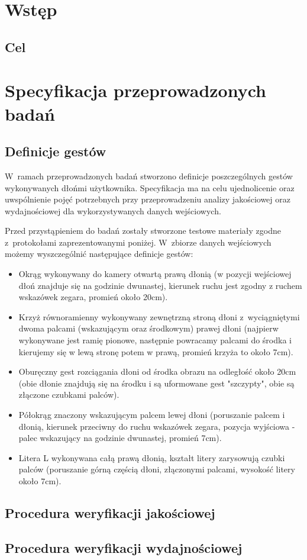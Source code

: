\chapter{Wstęp}\label{Chapter_Wstep}

\section{Cel}\label{Section_Cel}

\chapter{Specyfikacja przeprowadzonych badań}\label{Chapter_SpecyfikacjaPrzeprowadzonychBadan}

\section{Definicje gestów}\label{Section_DefinicjeGestow}

W~ramach przeprowadzonych badań stworzono definicje poszczególnych gestów wykonywanych dłońmi użytkownika. Specyfikacja ma na celu ujednolicenie oraz uwspólnienie pojęć potrzebnych przy przeprowadzeniu analizy jakościowej oraz wydajnościowej dla wykorzystywanych danych wejściowych.

Przed przystąpieniem do badań zostały stworzone testowe materiały zgodne z~protokołami zaprezentowanymi poniżej. W~zbiorze danych wejściowych możemy wyszczególnić następujące definicje gestów:

\begin{itemize}
  \item Okrąg wykonywany do kamery otwartą prawą dłonią (w pozycji wejściowej dłoń znajduje się na godzinie dwunastej, kierunek ruchu jest zgodny z ruchem wskazówek zegara, promień około 20cm).
  \item Krzyż równoramienny wykonywany zewnętrzną stroną dłoni z~wyciągniętymi dwoma palcami (wskazującym oraz środkowym) prawej dłoni (najpierw wykonywane jest ramię pionowe, następnie powracamy palcami do środka i kierujemy się w lewą stronę potem w prawą, promień krzyża to około 7cm).
  \item Oburęczny gest rozciągania dłoni od środka obrazu na odległość około 20cm (obie dłonie znajdują się na środku i są uformowane gest "szczypty", obie są złączone czubkami palców).
  \item Półokrąg znaczony wskazującym palcem lewej dłoni (poruszanie palcem i dłonią, kierunek przeciwny do ruchu wskazówek zegara, pozycja wyjściowa - palec wskazujący na godzinie dwunastej, promień 7cm).
  \item Litera L wykonywana całą prawą dłonią, kształt litery zarysowują czubki palców (poruszanie górną częścią dłoni, złączonymi palcami, wysokość litery około 7cm).
\end{itemize}

\section{Procedura weryfikacji jakościowej}\label{Section_ProceduraWeryfikacjiJakosciowej}

\section{Procedura weryfikacji wydajnościowej}\label{Section_ProceduraWeryfikacjiWydajnosciowej}
